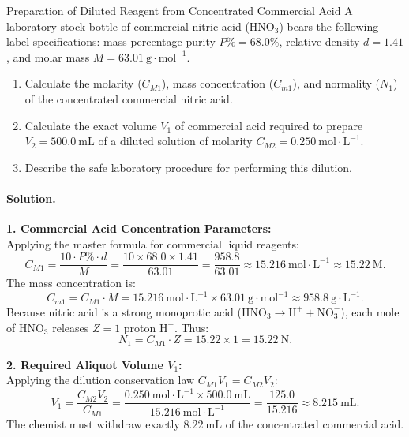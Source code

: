 \begin{workedexample}{Preparation of Diluted Reagent from Concentrated Commercial Acid}
A laboratory stock bottle of commercial nitric acid ($\mathrm{HNO_3}$) bears the following label specifications: mass percentage purity $P\% = 68.0\%$, relative density $d = 1.41$, and molar mass $M = 63.01\ \mathrm{g\cdot mol^{-1}}$.
\begin{enumerate}[leftmargin=1.4em,itemsep=3pt]
  \item Calculate the molarity ($C_{M1}$), mass concentration ($C_{m1}$), and normality ($N_1$) of the concentrated commercial nitric acid.
  \item Calculate the exact volume $V_1$ of commercial acid required to prepare $V_2 = 500.0\ \mathrm{mL}$ of a diluted solution of molarity $C_{M2} = 0.250\ \mathrm{mol\cdot L^{-1}}$.
  \item Describe the safe laboratory procedure for performing this dilution.
\end{enumerate}

\paragraph{Solution.}
\textbf{1. Commercial Acid Concentration Parameters:}\\
Applying the master formula for commercial liquid reagents:
\[
C_{M1} = \frac{10 \cdot P\% \cdot d}{M} = \frac{10 \times 68.0 \times 1.41}{63.01} = \frac{958.8}{63.01} \approx 15.216\ \mathrm{mol\cdot L^{-1}} \approx \mathbf{15.22\ \mathrm{M}}.
\]
The mass concentration is:
\[
C_{m1} = C_{M1} \cdot M = 15.216\ \mathrm{mol\cdot L^{-1}} \times 63.01\ \mathrm{g\cdot mol^{-1}} \approx 958.8\ \mathrm{g\cdot L^{-1}}.
\]
Because nitric acid is a strong monoprotic acid ($\mathrm{HNO_3} \to \mathrm{H}^+ + \mathrm{NO_3^-}$), each mole of $\mathrm{HNO_3}$ releases $Z = 1$ proton $\mathrm{H}^+$. Thus:
\[
N_1 = C_{M1} \cdot Z = 15.22 \times 1 = \mathbf{15.22\ \mathrm{N}}.
\]

\textbf{2. Required Aliquot Volume $V_1$:}\\
Applying the dilution conservation law $C_{M1} V_1 = C_{M2} V_2$:
\[
V_1 = \frac{C_{M2} V_2}{C_{M1}} = \frac{0.250\ \mathrm{mol\cdot L^{-1}} \times 500.0\ \mathrm{mL}}{15.216\ \mathrm{mol\cdot L^{-1}}} = \frac{125.0}{15.216} \approx \mathbf{8.215\ \mathrm{mL}}.
\]
The chemist must withdraw exactly $8.22\ \mathrm{mL}$ of the concentrated commercial acid.


\end{workedexample}
